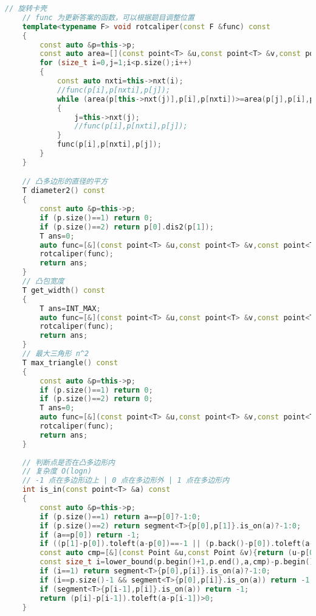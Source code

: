 \documentclass[a4paper]{book}
\begin{document}
\begin{lstlisting}[language=c++]
    // 旋转卡壳
    // func 为更新答案的函数，可以根据题目调整位置
    template<typename F> void rotcaliper(const F &func) const
    {
        const auto &p=this->p;
        const auto area=[](const point<T> &u,const point<T> &v,const point<T> &w){return (w-u)^(w-v);};
        for (size_t i=0,j=1;i<p.size();i++)
        {
            const auto nxti=this->nxt(i);
            //func(p[i],p[nxti],p[j]);
            while (area(p[this->nxt(j)],p[i],p[nxti])>=area(p[j],p[i],p[nxti]))
            {
                j=this->nxt(j);
                //func(p[i],p[nxti],p[j]);
            }
            func(p[i],p[nxti],p[j]);
        }
    }

    // 凸多边形的直径的平方
    T diameter2() const
    {
        const auto &p=this->p;
        if (p.size()==1) return 0;
        if (p.size()==2) return p[0].dis2(p[1]);
        T ans=0;
        auto func=[&](const point<T> &u,const point<T> &v,const point<T> &w){ans=max({ans,w.dis2(u),w.dis2(v)});};
        rotcaliper(func);
        return ans;
    }
    // 凸包宽度
	T get_width() const
    {
        T ans=INT_MAX;
        auto func=[&](const point<T> &u,const point<T> &v,const point<T> &w){ans=min({ans,Line{u,v-u}.dis(w)});};
        rotcaliper(func);
        return ans;
    }
    // 最大三角形 n^2 
    T max_triangle() const
    {
        const auto &p=this->p;
        if (p.size()==1) return 0;
        if (p.size()==2) return 0;
        T ans=0;
        auto func=[&](const point<T> &u,const point<T> &v,const point<T> &w){ans=max({ans,(w-u)^(w-v)});};
        rotcaliper(func);
        return ans;
    }
    
    // 判断点是否在凸多边形内
    // 复杂度 O(logn)
    // -1 点在多边形边上 | 0 点在多边形外 | 1 点在多边形内
    int is_in(const point<T> &a) const
    {
        const auto &p=this->p;
        if (p.size()==1) return a==p[0]?-1:0;
        if (p.size()==2) return segment<T>{p[0],p[1]}.is_on(a)?-1:0; 
        if (a==p[0]) return -1;
        if ((p[1]-p[0]).toleft(a-p[0])==-1 || (p.back()-p[0]).toleft(a-p[0])==1) return 0;
        const auto cmp=[&](const Point &u,const Point &v){return (u-p[0]).toleft(v-p[0])==1;};
        const size_t i=lower_bound(p.begin()+1,p.end(),a,cmp)-p.begin();
        if (i==1) return segment<T>{p[0],p[i]}.is_on(a)?-1:0;
        if (i==p.size()-1 && segment<T>{p[0],p[i]}.is_on(a)) return -1;
        if (segment<T>{p[i-1],p[i]}.is_on(a)) return -1;
        return (p[i]-p[i-1]).toleft(a-p[i-1])>0;
    }


\end{lstlisting}
\end{document}
